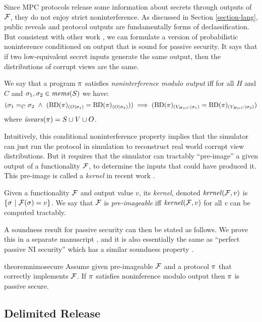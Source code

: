 Since MPC protocols release some information about secrets through
outputs of $\mathcal{F}$, they do not enjoy strict noninterference.  As
discussed in Section \ref{section-lang}, public reveals and protocol
outputs are fundamentally forms of declassification.  But consistent
with other work \cite{8429300}, we can formulate a version of
probabilistic noninterence conditioned on output that is sound
for passive security. It says that if two low-equivalent secret
inputs generate the same output, then the distributions of corrupt
views are the same. 
\begin{definition}
  \label{definition-NIMO}
  We say that a program $\pi$ satisfies \emph{noninterference modulo output}
  iff for all $H$ and $C$ and 
  $\sigma_1,\sigma_2 \in \mathit{mems}(S)$ we have:
  $$
  (\store_1 =_C \store_2 \ \wedge \ 
  (\condd{\progtt(\prog)}{O}{\store_1} = \condd{\progtt(\prog)}{O}{\store_2}))
  \implies 
  (\condd{\progtt(\prog)}{\houtputs}{\store_1} = \condd{\progtt(\prog)}{\houtputs}{\store_2})
  $$
  where $\mathit{iovars}(\pi) = S \cup V \cup O$.
\end{definition}
Intuitively, this conditional noninterference property implies that
the simulator can just run the protocol in simulation to
reconstruct real world corrupt view distributions. But it requires
that the simulator can tractably ``pre-image'' a given output of
a functionality $\mathcal{F}$, to determine the inputs that
could have produced it. This pre-image is called a
\emph{kernel} in recent work \cite{XXX}.
\begin{definition}
  Given a functionality $\mathcal{F}$ and output value $v$, its
  \emph{kernel}, denoted $\mathit{kernel}(\mathcal{F},v)$ is
  $
  \{ \sigma\ |\ \mathcal{F}(\sigma) = v \}
  $.
  We say that $\mathcal{F}$ is \emph{pre-imageable} iff $\mathit{kernel}(\mathcal{F}, v)$ for all
  $v$ can be computed tractably.
\end{definition}
A soundness result for passive security can then be stated as follows.
We prove this in a separate manuscript \cite{XXX}, and it is also
essentially the same as ``perfect passive NI security'' which
has a similar soundness property \cite{8429300}.  
\begin{restatable}{theorem}{nimosecure}
  \label{theorem-nimo}
  Assume given pre-imageable $\mathcal{F}$ and a protocol $\pi$ that
  correctly implements $\mathcal{F}$.  If $\pi$ satisfies noninference modulo output
  then $\pi$ is passive secure.
\end{restatable}

\subsection{Delimited Release}

